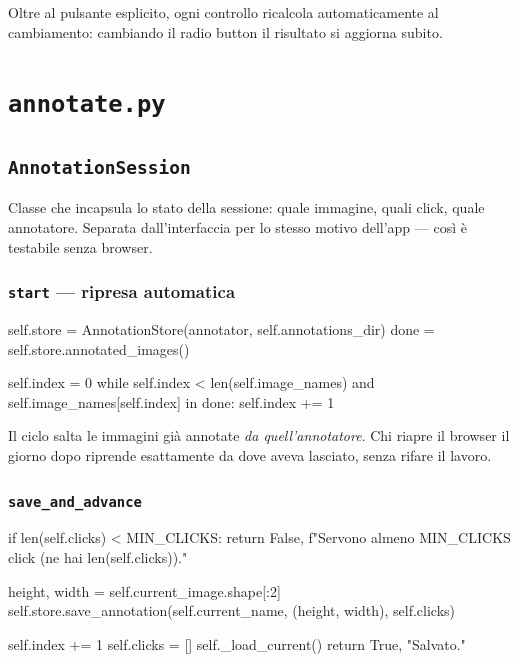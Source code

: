 Oltre al pulsante esplicito, ogni controllo ricalcola automaticamente al cambiamento: cambiando
il radio button il risultato si aggiorna subito.

\section{\texttt{annotate.py}}

\subsection{\texttt{AnnotationSession}}

Classe che incapsula lo stato della sessione: quale immagine, quali click, quale annotatore.
Separata dall'interfaccia per lo stesso motivo dell'app --- così è testabile senza browser.

\subsubsection{\texttt{start} --- ripresa automatica}

\begin{idebox}
\begin{pycode}
self.store = AnnotationStore(annotator, self.annotations_dir)
done = self.store.annotated_images()

self.index = 0
while self.index < len(self.image_names) and self.image_names[self.index] in done:
    self.index += 1
\end{pycode}
\end{idebox}

Il ciclo salta le immagini già annotate \emph{da quell'annotatore}. Chi riapre il browser il
giorno dopo riprende esattamente da dove aveva lasciato, senza rifare il lavoro.

\subsubsection{\texttt{save\_and\_advance}}

\begin{idebox}
\begin{pycode}
if len(self.clicks) < MIN_CLICKS:
    return False, f"Servono almeno {MIN_CLICKS} click (ne hai {len(self.clicks)})."

height, width = self.current_image.shape[:2]
self.store.save_annotation(self.current_name, (height, width), self.clicks)

self.index += 1
self.clicks = []
self._load_current()
return True, "Salvato."
\end{pycode}
\end{idebox}

